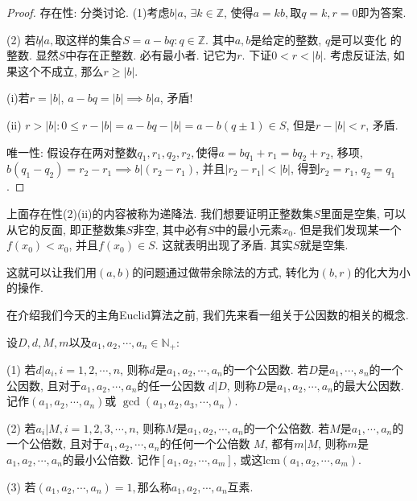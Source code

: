 \begin{proof}
    存在性: 分类讨论. (1)考虑$b|a$, $\exists k\in \mathbb Z$, 使得$a=kb, $取$q=k, r=0$即为答案. 

    (2) 若$b\not | a, $取这样的集合$S={a-bq: q\in \mathbb Z}$. 其中$a,b$是给定的整数, $q$是可以变化
    的整数. 显然$S$中存在正整数. 必有最小者. 记它为$r$. 下证$0<r<|b|$. 考虑反证法, 如果这个不成立, 
    那么$r\geq |b|$. 
    
    (i)若$r=|b|$, $a-bq=|b|\implies b|a$, 矛盾! 

    (ii) $r>|b|: 0\leq r-|b|=a-bq-|b|=a-b(q\pm 1)\in S$, 但是$r-|b|<r$, 矛盾. 

    唯一性: 假设存在两对整数$q_1, r_1, q_2, r_2, $使得$a=bq_1+r_1=bq_2+r_2$, 移项, 
    $b(q_1-q_2)=r_2-r_1\implies b|(r_2-r_1)$, 并且$|r_2-r_1|<|b|$, 得到$r_2=r_1$, $q_2=q_1$. 
\end{proof}

上面存在性(2)(ii)的内容被称为递降法. 我们想要证明正整数集$S$里面是空集, 可以从它的反面, 即正整数集$S$非空, 
其中必有$S$中的最小元素$x_0$. 但是我们发现某一个$f(x_0)<x_0$, 并且$f(x_0)\in S$. 这就表明出现了矛盾. 
其实$S$就是空集. 

这就可以让我们用$(a,b)$的问题通过做带余除法的方式, 转化为$(b,r)$的化大为小的操作. 

在介绍我们今天的主角Euclid算法之前, 我们先来看一组关于公因数的相关的概念. 

\begin{definition}
    设$D,d, M, m$以及$a_1, a_2, \cdots, a_n \in \mathbb N_+$: 

    (1) 若$d|a_i,i=1,2,\cdots, n$, 则称$d$是$a_1, a_2, \cdots, a_n$的一个公因数. 
    若$D$是$a_1, \cdots, s_n$的一个公因数, 且对于$a_1, a_2, \cdots, a_n$的任一公因数
    $d|D$, 则称$D$是$a_1, a_2,\cdots, a_n$的最大公因数. 记作$(a_1, a_2,\cdots, a_n)$或 
    $\gcd(a_1, a_2, a_3, \cdots, a_n)$. 

    (2) 若$a_i | M, i=1,2,3,\cdots, n$, 则称$M$是$a_1, a_2, \cdots, a_n$的一个公倍数. 
    若$M$是$a_1, \cdots, a_n$的一个公倍数, 且对于$a_1, a_2, \cdots, a_n$的任何一个公倍数
    $M$, 都有$m|M$, 则称$m$是$a_1, a_2, \cdots, a_n$的最小公倍数. 记作$[a_1, a_2, \cdots, a_m]$,
    或这$\text{lcm}(a_1, a_2, \cdots, a_m)$. 

    (3) 若$(a_1, a_2, \cdots, a_n) = 1, $那么称$a_1, a_2, \cdots, a_n$互素. 
\end{definition}


